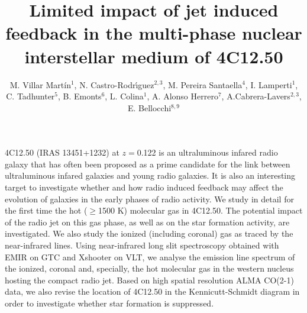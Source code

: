 \documentclass{aa}
\begin{document}
\title{Limited impact of jet induced feedback in the multi-phase nuclear interstellar medium of   4C12.50}
\author{M. Villar Mart\'{i}n$^{1}$, N. Castro-Rodr\'\i guez$^{2,3}$, M. Pereira Santaella$^4$, I. Lamperti$^1$,  C. Tadhunter$^5$, B. Emonts$^6$, L. Colina$^{1}$, A. Alonso Herrero$^{7}$, A.Cabrera-Lavers$^{2,3}$, E. Bellocchi$^{8,9}$}
\date{}
\abstract 
{4C12.50 (IRAS 13451+1232) at $z=$0.122  is  an ultraluminous infared radio galaxy that has often been proposed as a prime candidate for the link between ultraluminous infared galaxies and young radio galaxies. It is also an interesting target to investigate whether and how radio induced feedback may affect the evolution of galaxies in the early phases of radio activity.}
{We study in detail for the first time the hot ($\ge$1500 K) molecular gas  in 4C12.50.  The potential impact of the radio jet on this gas phase, as well as on the star formation activity, are  investigated. We also study the ionized (including coronal) gas as traced by the near-infrared lines.}
{Using near-infrared long slit spectroscopy obtained with EMIR on GTC and Xshooter on VLT, we analyse the emission line spectrum of the ionized, coronal and, specially, the hot molecular gas in the western nucleus hosting the compact radio jet. Based on high spatial resolution ALMA CO(2-1) data, we also revise the location of 4C12.50 in the Kennicutt-Schmidt diagram in order to investigate whether star formation is suppressed.}
\end{document}
